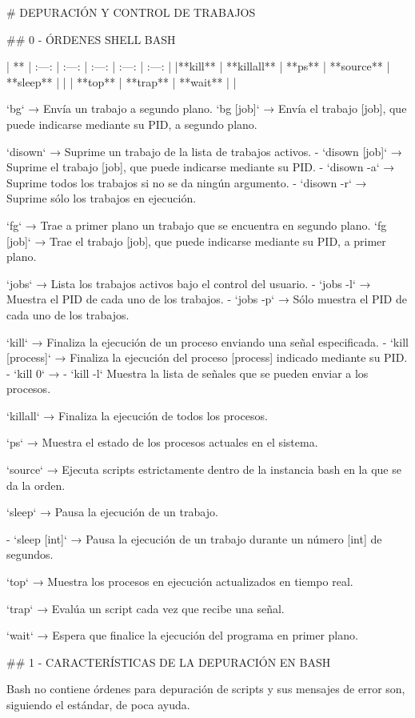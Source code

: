 # DEPURACIÓN Y CONTROL DE TRABAJOS

## 0 - ÓRDENES SHELL BASH

| **%
| :---: | :---: | :---: | :---: | :---: |
|**kill** | **killall** | **ps** | **source** | **sleep** |
|  | **top** | **trap** | **wait** | |

`bg` → Envía un trabajo a segundo plano.
`bg [job]` → Envía el trabajo [job], que puede indicarse mediante su PID, a segundo plano.

`disown` → Suprime un trabajo de la lista de trabajos activos.
- `disown [job]` → Suprime el trabajo [job], que puede indicarse mediante su PID.
- `disown -a` → Suprime todos los trabajos si no se da ningún argumento.
- `disown -r` → Suprime sólo los trabajos en ejecución.

`fg` → Trae a primer plano un trabajo que se encuentra en segundo plano.
`fg [job]` → Trae el trabajo [job], que puede indicarse mediante su PID, a primer plano.

`jobs` → Lista los trabajos activos bajo el control del usuario.
- `jobs -l` → Muestra el PID de  cada uno de los trabajos.
- `jobs -p` → Sólo muestra el PID de cada uno de los trabajos.

`kill` → Finaliza la ejecución de un proceso enviando una señal especificada.
- `kill [process]` → Finaliza la ejecución del proceso [process] indicado mediante su PID.
- `kill 0` → 
- `kill -l` Muestra la lista de señales que se pueden enviar a los procesos.

`killall` → Finaliza la ejecución de todos los procesos. 

`ps` → Muestra el estado de los procesos actuales en el sistema.

`source` → Ejecuta scripts estrictamente dentro de la instancia bash en la que se da la orden.

`sleep` → Pausa la ejecución de un trabajo.

- `sleep [int]` → Pausa la ejecución de un trabajo durante un número [int] de segundos.

`top` → Muestra los procesos en ejecución actualizados en tiempo real.

`trap` → Evalúa un script cada vez que recibe una señal.

`wait` → Espera que finalice la ejecución del programa en primer plano.

## 1 - CARACTERÍSTICAS DE LA DEPURACIÓN EN BASH

Bash no contiene órdenes para depuración de scripts y sus mensajes de error son, siguiendo el estándar, de poca ayuda.

